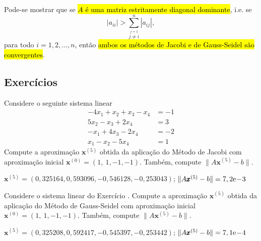 \begin{obs}{}
  Pode-se mostrar que se \hl{$A$ é uma matriz estritamente diagonal dominante}, i.e. se
  \begin{equation}
    |a_{ii}| > \sum_{\overset{j=1}{j\neq i}}^n |a_{ij}|,
  \end{equation}
para todo $i = 1, 2, \ldots, n$, então \hl{ambos os métodos de Jacobi e de Gauss-Seidel são convergentes}.
\end{obs}

\subsection{Exercícios}

\begin{exer}\label{cap_sislin_sec_jgs:exer:jacobi}
  Considere o seguinte sistema linear
  \begin{align}
    -4x_1 + x_2 + x_3 - x_4 &= -1\\
    5x_2 -x_3 + 2x_4 &= 3\\
    -x_1 + 4x_3 - 2x_4 &= -2\\
    x_1 -x_2 -5x_4 &= 1
  \end{align}
  Compute a aproximação $\pmb{x}^{(5)}$ obtida da aplicação do Método de Jacobi com aproximação inicial $\pmb{x}^{(0)} = (1, ~1, -1, -1)$. Também, compute $\|A\pmb{x}^{(5)} - b\|$.
\end{exer}
\begin{resp}
  $\pmb{x}^{(5)} = (0,325164, 0,593096, -0,546128, -0,253043)$; $\|A\pmb{x}^{(5)}-b\| = 7,2\mathrm{e}\!-\!3$
\end{resp}

\begin{exer}
  Considere o sistema linear do Exercício \label{cap_sislin_sec_jgs:exer:jacobi}. Compute a aproximação $\pmb{x}^{(5)}$ obtida da aplicação do Método de Gauss-Seidel com aproximação inicial $\pmb{x}^{(0)} = (1, ~1, -1, -1)$. Também, compute $\|A\pmb{x}^{(5)} - b\|$.
\end{exer}
\begin{resp}
  $\pmb{x}^{(5)} = (0,325208, 0,592417, -0,545397, -0,253442)$; $\|A\pmb{x}^{(5)}-b\| = 7,1\mathrm{e}\!-\!4$
\end{resp}

